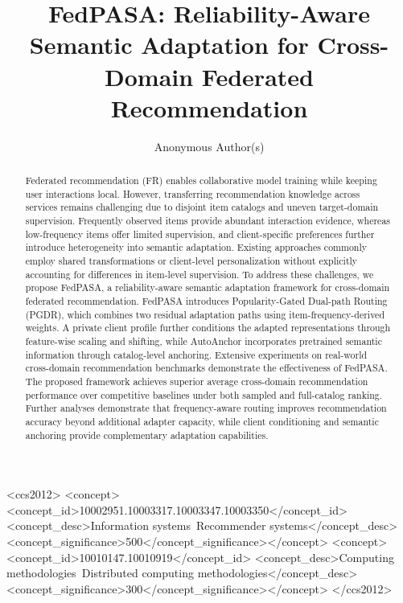 \documentclass[sigconf,anonymous,balance=false]{acmart}
\begin{document}
\raggedbottom

\title{FedPASA: Reliability-Aware Semantic Adaptation for Cross-Domain Federated Recommendation}

\author{Anonymous Author(s)}


\begin{abstract}
Federated recommendation (FR) enables collaborative model training while keeping user interactions local. However, transferring recommendation knowledge across services remains challenging due to disjoint item catalogs and uneven target-domain supervision. Frequently observed items provide abundant interaction evidence, whereas low-frequency items offer limited supervision, and client-specific preferences further introduce heterogeneity into semantic adaptation. Existing approaches commonly employ shared transformations or client-level personalization without explicitly accounting for differences in item-level supervision. To address these challenges, we propose FedPASA, a reliability-aware semantic adaptation framework for cross-domain federated recommendation. FedPASA introduces Popularity-Gated Dual-path Routing (PGDR), which combines two residual adaptation paths using item-frequency-derived weights. A private client profile further conditions the adapted representations through feature-wise scaling and shifting, while AutoAnchor incorporates pretrained semantic information through catalog-level anchoring. Extensive experiments on real-world cross-domain recommendation benchmarks demonstrate the effectiveness of FedPASA. The proposed framework achieves superior average cross-domain recommendation performance over competitive baselines under both sampled and full-catalog ranking. Further analyses demonstrate that frequency-aware routing improves recommendation accuracy beyond additional adapter capacity, while client conditioning and semantic anchoring provide complementary adaptation capabilities.
\end{abstract}


\begin{CCSXML}
<ccs2012>
<concept><concept_id>10002951.10003317.10003347.10003350</concept_id>
<concept_desc>Information systems~Recommender systems</concept_desc>
<concept_significance>500</concept_significance></concept>
<concept><concept_id>10010147.10010919</concept_id>
<concept_desc>Computing methodologies~Distributed computing methodologies</concept_desc>
<concept_significance>300</concept_significance></concept>
</ccs2012>
\end{CCSXML}
\end{document}
